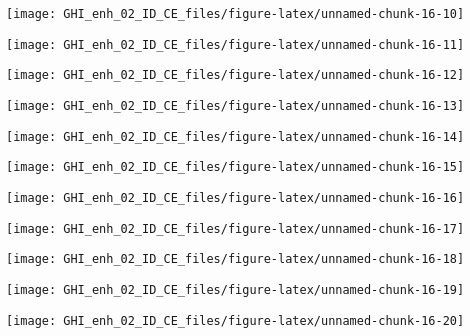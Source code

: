 \documentclass[
  10pt,
  a4paper,oneside]{article}
\begin{document}
\begin{center}\texttt{[image: GHI\_enh\_02\_ID\_CE\_files/figure-latex/unnamed-chunk-16-10]} \end{center}

\begin{center}\texttt{[image: GHI\_enh\_02\_ID\_CE\_files/figure-latex/unnamed-chunk-16-11]} \end{center}

\begin{center}\texttt{[image: GHI\_enh\_02\_ID\_CE\_files/figure-latex/unnamed-chunk-16-12]} \end{center}

\begin{center}\texttt{[image: GHI\_enh\_02\_ID\_CE\_files/figure-latex/unnamed-chunk-16-13]} \end{center}

\begin{center}\texttt{[image: GHI\_enh\_02\_ID\_CE\_files/figure-latex/unnamed-chunk-16-14]} \end{center}

\begin{center}\texttt{[image: GHI\_enh\_02\_ID\_CE\_files/figure-latex/unnamed-chunk-16-15]} \end{center}

\begin{center}\texttt{[image: GHI\_enh\_02\_ID\_CE\_files/figure-latex/unnamed-chunk-16-16]} \end{center}

\begin{center}\texttt{[image: GHI\_enh\_02\_ID\_CE\_files/figure-latex/unnamed-chunk-16-17]} \end{center}

\begin{center}\texttt{[image: GHI\_enh\_02\_ID\_CE\_files/figure-latex/unnamed-chunk-16-18]} \end{center}

\begin{center}\texttt{[image: GHI\_enh\_02\_ID\_CE\_files/figure-latex/unnamed-chunk-16-19]} \end{center}

\begin{center}\texttt{[image: GHI\_enh\_02\_ID\_CE\_files/figure-latex/unnamed-chunk-16-20]} \end{center}
\end{document}
